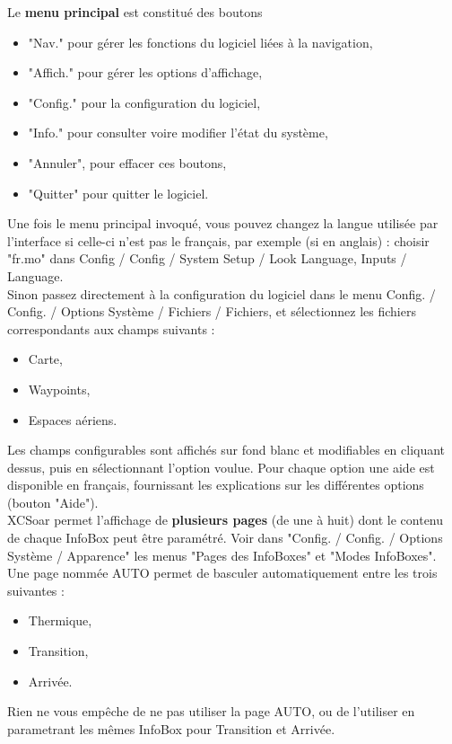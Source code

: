 \documentclass{article}
\begin{document}
Le \textbf{menu principal} est constitué des boutons
\begin{itemize}
\item "Nav." pour gérer les fonctions du logiciel liées à la navigation,
\item "Affich." pour gérer les options d'affichage,
\item "Config." pour la configuration du logiciel,
\item "Info." pour consulter voire modifier l'état du système,
\item "Annuler", pour effacer ces boutons,
\item "Quitter" pour quitter le logiciel.
\end{itemize}
%
Une fois le menu principal invoqué, vous pouvez changez la langue utilisée par l'interface si celle-ci n'est pas le français, par exemple (si en anglais) : choisir "fr.mo" dans Config / Config / System Setup / Look Language, Inputs / Language.\\
%
\newline
%
Sinon passez directement à la configuration du logiciel dans le menu Config. / Config. / Options Système / Fichiers / Fichiers, et sélectionnez les fichiers correspondants aux champs suivants :
\begin{itemize}
\item Carte,
\item Waypoints,
\item Espaces aériens.
\end{itemize}
Les champs configurables sont affichés sur fond blanc et modifiables en cliquant dessus, puis en sélectionnant l'option voulue. Pour chaque option une aide est disponible en français, fournissant les explications sur les différentes options (bouton "Aide").\\
%
\newline
%
XCSoar permet l'affichage de \textbf{plusieurs pages} (de une à huit) dont le contenu de chaque InfoBox peut être paramétré. Voir dans "Config. / Config. / Options Système / Apparence" les menus "Pages des InfoBoxes" et "Modes InfoBoxes".\\
Une page nommée AUTO permet de basculer automatiquement entre les trois suivantes :
\begin{itemize}
\item Thermique,
\item Transition,
\item Arrivée.
\end{itemize}
Rien ne vous empêche de ne pas utiliser la page AUTO, ou de l'utiliser en parametrant les mêmes InfoBox pour Transition et Arrivée.\\
\end{document}
